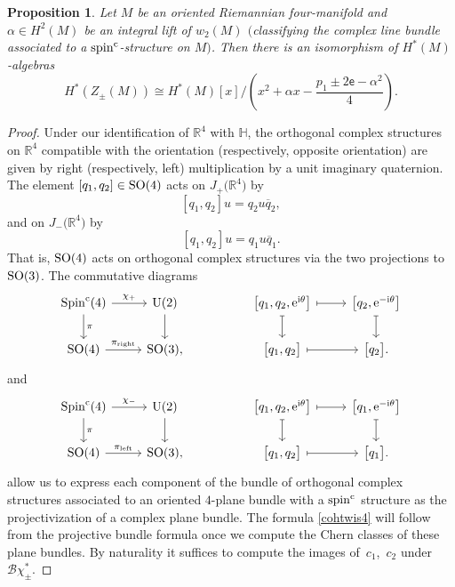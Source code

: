\documentclass[pdftex]{sigma}%
\newcommand{\R}{\mathbb{R}}
\newcommand{\HH}{\mathbb{H}}
\DeclareMathOperator{\Spin}{Spin}
\numberwithin{equation}{section}
\newtheorem{Proposition}[Theorem]{Proposition}
 { \theoremstyle{definition}
\newtheorem{Definition}[Theorem]{Definition}
\newtheorem{Note}[Theorem]{Note}
\newtheorem{Example}[Theorem]{Example}
\newtheorem{Remark}[Theorem]{Remark} }
\begin{document}
\begin{Proposition}
\label{cohtwist4}
Let $M$ be an oriented Riemannian four-manifold and $\alpha \in H^2(M)$ be an integral
lift of $w_2(M)$ $($classifying the complex line bundle associated to a ${\rm spin}^{\rm c}$-structure on $M)$. Then there is an isomorphism of $H^*(M)$-algebras
\begin{equation}
\label{cohtwis4}
H^*(Z_\pm(M)) \cong H^*(M)[x]/\left( x^2 + \alpha x - \frac{ p_1 \pm 2\mathsf{e} - \alpha^2}{4} \right).
\end{equation}
\end{Proposition}
\begin{proof}
Under our identification of $\R^4$ with $\HH$,
the orthogonal complex structures on $\R^4$ compatible with the orientation (respectively, opposite orientation) are given by right (respectively, left) multiplication by a unit imaginary quaternion. The element $[q_1,q_2] \in {\rm SO}(4)$ acts on $J_+\big(\R^4\big)$ by
\[
[q_1,q_2] u = q_2 u \overline q_2,
\]
and on $J_-\big(\R^4\big)$ by
\[
[q_1,q_2] u = q_1 u \overline q_1.
\]
That is, ${\rm SO}(4)$ acts on orthogonal complex structures via the two projections to ${\rm SO}(3)$.
The commutative diagrams
\[
\begin{tikzcd}
\Spin^{\rm c}(4) \arrow[d,"\pi"] \arrow[r,"\chi_+"] & {\rm U}(2) \arrow[d] & & \big[q_1,q_2,{\rm e}^{{\rm i}\theta}\big] \arrow[d, mapsto] \arrow[r, mapsto] & \big[q_2, {\rm e}^{-{\rm i}\theta}\big] \arrow[d, mapsto] \\
{\rm SO}(4) \arrow[r, "\pi_{\mathrm{right}}"] & {\rm SO}(3), & & \big[q_1,q_2\big] \arrow[r, mapsto] & \big[q_2\big].
\end{tikzcd}
\]
and
\[
\begin{tikzcd}
\Spin^{\rm c}(4) \arrow[d,"\pi"] \arrow[r,"\chi_-"] & {\rm U}(2) \arrow[d] & & \big[q_1,q_2,{\rm e}^{{\rm i}\theta}\big] \arrow[d, mapsto] \arrow[r, mapsto] & \big[q_1, {\rm e}^{-{\rm i}\theta}\big] \arrow[d, mapsto] \\
{\rm SO}(4) \arrow[r, "\pi_{\mathrm{left}}"] & {\rm SO}(3), & & \big[q_1,q_2\big] \arrow[r, mapsto] & \big[q_1\big].
\end{tikzcd}
\]
allow us to express each component of the bundle of orthogonal complex structures
associated to an oriented $4$-plane bundle with a ${\rm spin}^{\rm c}$ structure as the projectivization of a complex plane bundle. The formula \eqref{cohtwis4} will follow from the projective bundle formula once we compute the Chern classes of these plane bundles. By naturality it suffices to compute the images of~$c_1$,~$c_2$ under ${\mathcal B}\chi_{\pm}^*$.


\end{proof}
\end{document}

